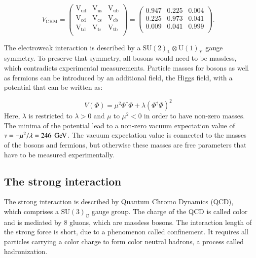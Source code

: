  \begin{equation}
V_{\mathrm{CKM}}=  
\begin{pmatrix}
\mathrm{V}_{\mathrm{ud}} & \mathrm{V}_{\mathrm{us}} & \mathrm{V}_{\mathrm{ub}} \\
\mathrm{V}_{\mathrm{cd}} & \mathrm{V}_{\mathrm{cs}} & \mathrm{V}_{\mathrm{cb}} \\
\mathrm{V}_{\mathrm{td}} & \mathrm{V}_{\mathrm{ts}} & \mathrm{V}_{\mathrm{tb}} \\
\end{pmatrix}
= 
\begin{pmatrix}
0.947 & 0.225 & 0.004 \\
0.225 & 0.973 & 0.041 \\
0.009 & 0.041 & 0.999 \\
\end{pmatrix}
.
\label{eq:theo_ckm}
\end{equation}

The electroweak interaction is described by a  $\mathrm{SU}(2)_\mathrm{L}\otimes \mathrm{U}(1)_\mathrm{Y}$ gauge symmetry. To preserve that symmetry, all bosons would need to be massless, which contradicts experimental
measurements. 
Particle masses for bosons as well as fermions can be introduced by an additional field, the Higgs field, with a potential that can be written as:

\begin{equation}
V(\Phi) =  \mu^2 \Phi^\dagger \Phi + \lambda(\Phi^\dagger \Phi)^2
\end{equation}
Here, $\lambda$ is restricted to $\lambda > 0$ and $\mu$ to $\mu^2<0$ in order to have non-zero masses. The minima of the potential lead to a non-zero vacuum expectation value of $v = - \mu^2 / \lambda = 246 \; \,\text{Ge\hspace{-.08em}V}$\cite{Olive:2016xmw}.
The vacuum expectation value is connected to the masses of the bosons and fermions, but otherwise these masses are free parameters that have to be measured experimentally.

\subsection{The strong interaction}
\label{sec:theo_qcd}

The strong interaction is described by Quantum Chromo Dynamics (QCD), which comprises a $\mathrm{SU}(3)_\mathrm{C}$ gauge group. The charge of the QCD is called color and is mediated by 8 gluons, which are massless bosons.
The interaction length of the strong force is short, due to a phenomenon called confinement. It requires all particles carrying a color charge to form color neutral hadrons, a process called hadronization.


